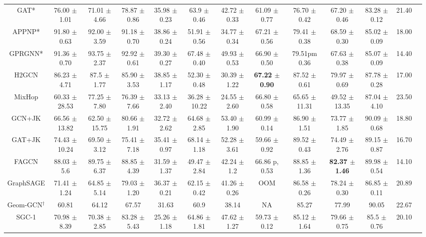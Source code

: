 \documentclass{article}
\newcommand{\0}{{\boldsymbol{0}}}
\newcommand{\6}{{\partial}}
\newcommand{\8}{{\infty}}
\newcommand{\4}{{\nabla}}
\begin{document}
\begin{table}[htbp]
\begin{tabular}{c|cccccccccc|cc}
    \midrule
    GAT*   & 76.00 $\pm$ 1.01 & 71.01 $\pm$ 4.66 & 78.87 $\pm$ 0.86 & 35.98 $\pm$ 0.23 & 63.9 $\pm$ 0.46 & 42.72 $\pm$ 0.33 & 61.09 $\pm$ 0.77 & 76.70 $\pm$ 0.42 & 67.20 $\pm$ 0.46 & 83.28 $\pm$ 0.12 & 21.40 \\
    APPNP* & 91.80 $\pm$ 0.63 & 92.00 $\pm$ 3.59 & 91.18 $\pm$ 0.70 & 38.86 $\pm$ 0.24 & 51.91 $\pm$ 0.56 & 34.77 $\pm$ 0.34 & 67.21 $\pm$ 0.56 & 79.41 $\pm$ 0.38 & 68.59 $\pm$ 0.30 & 85.02 $\pm$ 0.09 & 18.00 \\
    GPRGNN* & 91.36 $\pm$ 0.70 & 93.75 $\pm$ 2.37 & 92.92 $\pm$ 0.61 & 39.30 $\pm$ 0.27 & 67.48 $\pm$ 0.40 & 49.93 $\pm$ 0.53 & 66.90 $\pm$ 0.50 & 79.51pm 0.36 & 67.63 $\pm$ 0.38 & 85.07 $\pm$ 0.09 & 14.40 \\
    H2GCN & 86.23 $\pm$ 4.71 & 87.5 $\pm$ 1.77 & 85.90 $\pm$ 3.53 & 38.85 $\pm$ 1.17 & 52.30 $\pm$ 0.48 & 30.39 $\pm$ 1.22 & \cellcolor[rgb]{ .816,  .808,  .808}\textbf{67.22 $\pm$ 0.90} & 87.52 $\pm$ 0.61 & 79.97 $\pm$ 0.69 & 87.78 $\pm$ 0.28 & 17.00 \\
    MixHop & 60.33 $\pm$ 28.53 & 77.25 $\pm$ 7.80 & 76.39 $\pm$ 7.66 & 33.13 $\pm$ 2.40 & 36.28 $\pm$ 10.22 & 24.55 $\pm$ 2.60 & 66.80 $\pm$ 0.58 & 65.65 $\pm$ 11.31 & 49.52 $\pm$ 13.35 & 87.04 $\pm$ 4.10 & 23.50 \\
    GCN+JK & 66.56 $\pm$ 13.82 & 62.50 $\pm$ 15.75 & 80.66 $\pm$ 1.91 & 32.72 $\pm$ 2.62 & 64.68 $\pm$ 2.85 & 53.40 $\pm$ 1.90 & 60.99 $\pm$ 0.14 & 86.90 $\pm$ 1.51 & 73.77 $\pm$ 1.85 & 90.09 $\pm$ 0.68 & 18.80 \\
     GAT+JK & 74.43 $\pm$ 10.24 & 69.50 $\pm$ 3.12 & 75.41 $\pm$ 7.18 & 35.41 $\pm$ 0.97 & 68.14 $\pm$ 1.18 & 52.28 $\pm$ 3.61 & 59.66 $\pm$ 0.92 & 89.52 $\pm$ 0.43 & 74.49 $\pm$ 2.76 & 89.15 $\pm$ 0.87 & 16.70 \\
    FAGCN & 88.03 $\pm$ 5.6 & 89.75 $\pm$ 6.37 & 88.85 $\pm$ 4.39 & 31.59 $\pm$ 1.37 & 49.47 $\pm$ 2.84 & 42.24 $\pm$ 1.2 & 66.86 p, 0.53 & 88.85 $\pm$ 1.36 & \cellcolor[rgb]{ .816,  .808,  .808}\textbf{82.37 $\pm$ 1.46} & 89.98 $\pm$ 0.54 & 14.10 \\
    GraphSAGE & 71.41 $\pm$ 1.24 & 64.85 $\pm$ 5.14 & 79.03 $\pm$ 1.20 & 36.37 $\pm$ 0.21 & 62.15 $\pm$ 0.42 & 41.26 $\pm$ 0.26 & OOM   & 86.58 $\pm$ 0.26 & 78.24 $\pm$ 0.30 & 86.85 $\pm$ 0.11 & 20.89 \\
    Geom-GCN$^\dagger$ & 60.81 & 64.12 & 67.57 & 31.63 & 60.9  & 38.14 & NA    & 85.27 & 77.99 & 90.05 & 22.67 \\
    \midrule
    SGC-1 & 70.98 $\pm$ 8.39 & 70.38 $\pm$ 2.85 & 83.28 $\pm$ 5.43 & 25.26 $\pm$ 1.18 & 64.86 $\pm$ 1.81 & 47.62 $\pm$ 1.27 & 59.73 $\pm$ 0.12 & 85.12 $\pm$ 1.64 & 79.66 $\pm$ 0.75 & 85.5 $\pm$ 0.76 & 20.10 \\

\end{tabular}
\end{table}
\end{document}
